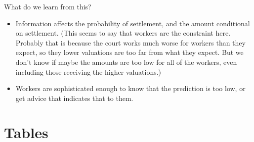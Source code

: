 \documentclass[oneside,11pt]{article}
\begin{document}
What do we learn from this? 
\begin{itemize}
    \item Information affects the probability of settlement, and the amount conditional on settlement. (This seems to say that workers are the constraint here. Probably that is because the court works much worse for workers than they expect, so they lower valuations are too far from what they expect. But we don't know if maybe the amounts are too low for all of the workers, even including those receiving the higher valuations.)
    \item Workers are sophisticated enough to know that the prediction is too low, or get advice that indicates that to them.
\end{itemize}




\newpage


\clearpage

%
%






\newpage
\singlespacing

\section{Tables}
\end{document}
